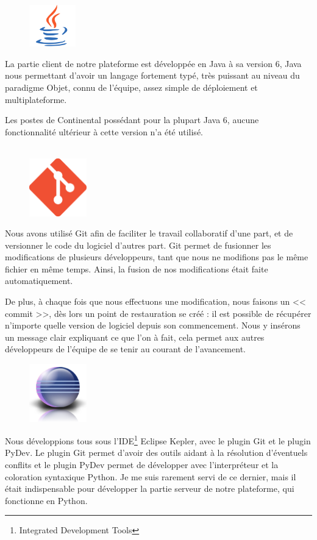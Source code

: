 \begin{figure}
	\includegraphics[width=2cm]{contents/images/logoJava.png}
\end{figure}
La partie client de notre plateforme est développée en Java à sa version 6, Java nous permettant d'avoir un langage fortement typé, très puissant au niveau du paradigme Objet, connu de l'équipe, assez simple de déploiement et multiplateforme. 

Les postes de Continental possédant pour la plupart Java 6, aucune fonctionnalité ultérieur à cette version n'a été utilisé.\\~

\begin{figure}
	\includegraphics[width=2.5cm]{contents/images/logoGit.png}
\end{figure}
Nous avons utilisé Git afin de faciliter le travail collaboratif d'une part, et de versionner le code du logiciel d'autres part. Git permet de fusionner les
modifications de plusieurs développeurs, tant que nous ne modifions pas le même fichier en même temps. Ainsi, la fusion de nos modifications était faite automatiquement. 

De plus, à chaque fois que nous effectuons une modification, nous faisons un << commit >>, dès lors un point de restauration se créé : il est possible de
récupérer n'importe quelle version de logiciel depuis son commencement. Nous y insérons un message clair expliquant ce que l'on à fait, cela permet aux autres développeurs de l'équipe de se tenir au courant de l'avancement.

\begin{figure}
	\includegraphics[width=2.5cm]{contents/images/logoEclipse.png}
\end{figure}
Nous développions tous sous l'IDE\footnote{Integrated Development Tools} Eclipse Kepler, avec le plugin Git et le plugin PyDev. Le plugin Git permet d’avoir des outils aidant à la résolution d’éventuels conflits et le plugin PyDev permet de développer avec l’interpréteur et la coloration syntaxique Python. Je me suis rarement servi de ce dernier, mais il était indispensable pour développer la partie serveur de notre plateforme, qui fonctionne en Python. 

